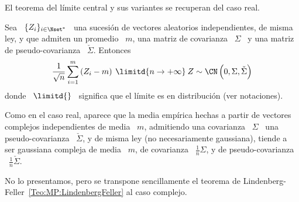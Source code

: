 El teorema del l\'imite central y sus variantes se recuperan del caso real.
%
\begin{teorema}
\label{Teo:MP:CLTComplejo}
%
Sea  \ $\{  Z_i \}_{i  \in  \Nset^*}$ \  una sucesi\'on  de vectores  aleatorios
independientes, de  misma ley, y  que admiten un  promedio \ $m$, una  matriz de
covarianza   \    $\Sigma$   \   y    una   matriz   de    pseudo-covarianza   \
$\check{\Sigma}$. Entonces
  \[
  \frac{1}{\sqrt{n}}  \sum_{i=1}^m  \left( Z_i  -  m  \right)  \: \limitd{n  \to
    +\infty} \: Z \sim \CN\left( 0 , \Sigma , \check{\Sigma} \right)
  \]
  donde  \ $\limitd{}$ \  significa que  el l\'imite  es en  distribuci\'on (ver
  notaciones).
\end{teorema}
%
%
Como en el caso real, aparece que  la media emp\'irica hechas a partir de vectores
complejos independientes de media \  $m$, admitiendo una covarianza \ $\Sigma$ \
una  pseudo-covarianza \  $\check{\Sigma}$, y  de misma  ley  (no necesariamente
gaussiana),  tiende a  ser gaussiana  compleja  de media  \ $m$,  de covarianza  \
$\frac{1}{n} \Sigma$, y de pseudo-covarianza \ $\frac{1}{n} \check{\Sigma}$.

No   lo   presentamos,  pero   se   transpone   sencillamente   el  teorema   de
Lindenberg-Feller~\ref{Teo:MP:LindenbergFeller} al caso complejo.

